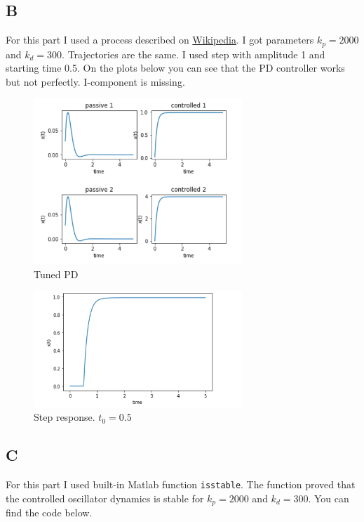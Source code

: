 \documentclass{article}
\begin{document}
\subsection{B}
For this part I used a process described on \href{https://en.wikipedia.org/wiki/PID_controller#Manual_tuning}{Wikipedia}. I got parameters $k_p = 2000$ and $k_d = 300$. Trajectories are the same.
I used step with amplitude 1 and starting time 0.5. On the plots below you can see that the PD controller works but not perfectly. I-component is missing.
\begin{figure}[H]
        \centering
        \includegraphics[width=0.7\textwidth]{images/2}
        \caption{Tuned PD}
        \label{fig:plot1b_1}
\end{figure}
\begin{figure}[H]
        \centering
        \includegraphics[width=0.7\textwidth]{images/3}
        \caption{Step response. $t_0 = 0.5$}
        \label{fig:plot1b_2}
\end{figure}
\subsection{C}
For this part I used built-in Matlab function \texttt{isstable}. The function proved that the controlled oscillator dynamics is stable for $k_p = 2000$ and $k_d = 300$. You can find the code below. 

\end{document}

